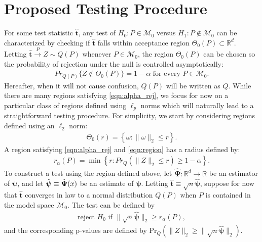 \documentclass{article}
\newcommand{\sh}{\textcolor{red}}
\newcommand{\disto}{P}
\newcommand{\tst}{\hat{\boldsymbol{t}}}
\newcommand{\rvv}{Z}
\newcommand{\distv}{Q}
\newcommand{\rnp}{\sqrt{n} \hat{\boldsymbol{\psi}}}
\begin{document}

\section{Proposed Testing Procedure}
\label{sec:prop_test_proc}

For some test statistic $\tst$, any test of $H_0 : \disto \in \mathscr{M}_0$ versus $H_1 : \disto \not\in \mathscr{M}_0$ can be characterized by checking if $\tst$ falls within acceptance region $\Theta_0(\disto) \subset \mathbb{R}^d$.  Letting $\tst \xrightarrow{P} \rvv \sim \distv(\disto)$ whenever $P \in \mathscr{M}_0$, the region $\Theta_0(\disto)$ can be chosen so the probability of rejection under the null is controlled asymptotically:
\begin{align}
  Pr_{\distv(P)}\{\rvv \not \in \Theta_0(P)\} = 1 - \alpha \text{ for every } P \in \mathscr{M}_0.\label{eqn:alpha_rej}
\end{align}
Hereafter, when it will not cause confusion, $\distv(P)$ will be written as $\distv$. While there are many regions satisfying \eqref{eqn:alpha_rej},  we focus for now on a particular class of regions defined using $\ell_p$ norms which will naturally lead to a straightforward testing procedure. For simplicity, we start by considering regions defined using an $\ell_2$ norm:
\begin{align}
	\Theta_0(r) = \left\{\omega : \|\omega\|_2 \leq r\right\}. \label{eqn:region}
\end{align}
A region satisfying \eqref{eqn:alpha_rej} and \eqref{eqn:region} has a radius defined by: 
\begin{align}
	r_\alpha(\disto) = \min\left\{r : Pr_{\distv}(\|\rvv\|_2 \leq r) \geq 1 - \alpha \right\}. \label{eqn:ra}
\end{align}
To construct a test using the region defined above, let $\hat{\boldsymbol{\Psi}} : \mathbb{R}^d \to \mathbb{R}$ be an estimator of $\boldsymbol{\psi}$, and let $\Hat{\boldsymbol{\psi}} \equiv \hat{\boldsymbol{\Psi}}(x)$ be an estimate of $\boldsymbol{\psi}$. Letting $\tst \equiv \sqrt{n}\hat{\boldsymbol{\psi}}$, suppose for now that  $\tst$ converges in law to a normal distribution $\distv(P)$ when $P$ is contained in the model space  $\mathcal{M}_0$. The test can be defined by 
\begin{align}
\label{eqn:simp_test}
	\text{reject } H_0 \text{ if } \|\rnp\|_2 \geq r_\alpha(P),
\end{align} 
and the corresponding p-values are defined by $
	\text{Pr}_\distv(\|\rvv\|_2 \geq \|\rnp\|_2)$.
\end{document}
